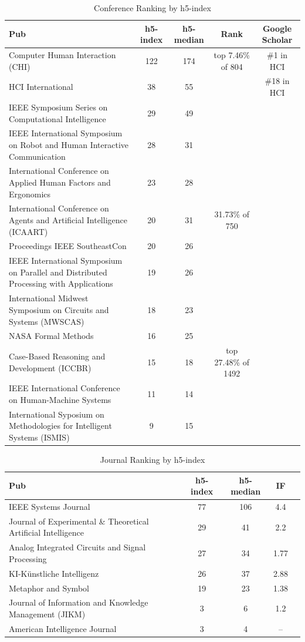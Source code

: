 \documentclass[12pt,letterpaper]{report}
\begin{document}
\begin{table}
\caption{Conference Ranking by h5-index}
\label{confh5}
\center
\begin{tabular}{|p{3in}|c|c|c|c|}
Pub & h5-index & h5-median & Rank  & Google Scholar \\ \hline
Computer Human Interaction (CHI)& 122 & 174  & top 7.46\% of 804 & \#1 in HCI\\ 
HCI International& 38 & 55 & & \#18 in HCI\\
IEEE Symposium Series on Computational Intelligence& 29 & 49 &  & \\
IEEE International Symposium on Robot and Human Interactive Communication & 28 & 31 & & \\
International Conference on Applied Human Factors and Ergonomics & 23 & 28 &  & \\
International Conference on Agents and Artificial Intelligence (ICAART)& 20 & 31 & 31.73\% of 750 & \\
Proceedings IEEE SoutheastCon & 20 & 26 & & \\
IEEE International Symposium on Parallel and Distributed Processing with Applications & 19 & 26 & & \\
International Midwest Symposium on Circuits and Systems (MWSCAS) & 18 & 23 & & \\
NASA Formal Methods & 16 & 25 & & \\
Case-Based Reasoning and Development (ICCBR)& 15& 18 & top 27.48\% of 1492 & \\
IEEE International Conference on Human-Machine Systems& 11& 14 & & \\
International Syposium on Methodologies for Intelligent Systems (ISMIS) & 9 & 15 & & \\
\end{tabular}
\end{table}


\begin{table}
\caption{Journal Ranking by h5-index}
\label{journalh5}
\center
\begin{tabular}{|p{4in}|c|c|c|c|}
Pub & h5-index & h5-median  & IF\\ \hline
  IEEE Systems Journal& 77 & 106 & 4.4  \\
Journal of Experimental \& Theoretical Artificial Intelligence & 29 & 41 & 2.2  \\
Analog Integrated Circuits and Signal Processing & 27 & 34  & 1.77 \\
KI-Künstliche Intelligenz & 26 & 37  & 2.88 \\
Metaphor and Symbol& 19 & 23  & 1.38 \\
Journal of Information and Knowledge Management (JIKM)& 3 & 6  & 1.2 \\
American Intelligence Journal& 3 & 4  & -- \\
\end{tabular}
\end{table}
\end{document}
